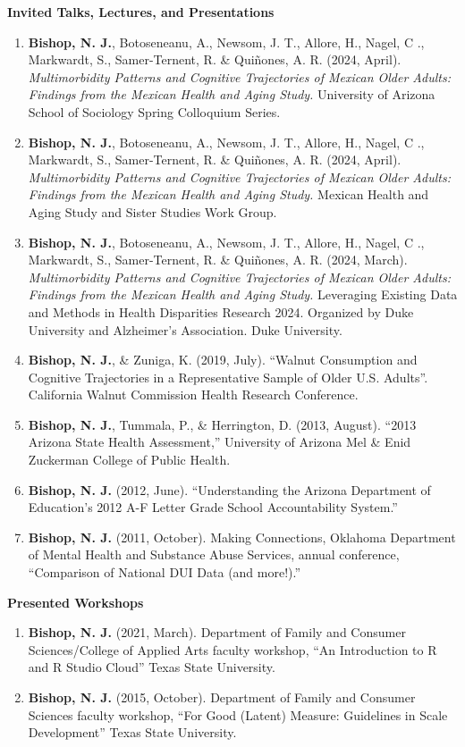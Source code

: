 \documentclass[
]{article}
\begin{document}
\textbf{Invited Talks, Lectures, and Presentations}

\begin{enumerate}
\def\labelenumi{\arabic{enumi}.}
\item
  \textbf{Bishop, N. J.}, Botoseneanu, A., Newsom, J. T., Allore, H.,
  Nagel, C ., Markwardt, S., Samer-Ternent, R. \& Quiñones, A. R. (2024,
  April). \emph{Multimorbidity Patterns and Cognitive Trajectories of
  Mexican Older Adults: Findings from the Mexican Health and Aging
  Study.} University of Arizona School of Sociology Spring Colloquium
  Series.
\item
  \textbf{Bishop, N. J.}, Botoseneanu, A., Newsom, J. T., Allore, H.,
  Nagel, C ., Markwardt, S., Samer-Ternent, R. \& Quiñones, A. R. (2024,
  April). \emph{Multimorbidity Patterns and Cognitive Trajectories of
  Mexican Older Adults: Findings from the Mexican Health and Aging
  Study.} Mexican Health and Aging Study and Sister Studies Work Group.
\item
  \textbf{Bishop, N. J.}, Botoseneanu, A., Newsom, J. T., Allore, H.,
  Nagel, C ., Markwardt, S., Samer-Ternent, R. \& Quiñones, A. R. (2024,
  March). \emph{Multimorbidity Patterns and Cognitive Trajectories of
  Mexican Older Adults: Findings from the Mexican Health and Aging
  Study.} Leveraging Existing Data and Methods in Health Disparities
  Research 2024. Organized by Duke University and Alzheimer's
  Association. Duke University.
\item
  \textbf{Bishop, N. J.}, \& Zuniga, K. (2019, July). ``Walnut
  Consumption and Cognitive Trajectories in a Representative Sample of
  Older U.S. Adults''. California Walnut Commission Health Research
  Conference.
\item
  \textbf{Bishop, N. J.}, Tummala, P., \& Herrington, D. (2013, August).
  ``2013 Arizona State Health Assessment,'' University of Arizona Mel \&
  Enid Zuckerman College of Public Health.
\item
  \textbf{Bishop, N. J.} (2012, June). ``Understanding the Arizona
  Department of Education's 2012 A-F Letter Grade School Accountability
  System.''
\item
  \textbf{Bishop, N. J.} (2011, October). Making Connections, Oklahoma
  Department of Mental Health and Substance Abuse Services, annual
  conference, ``Comparison of National DUI Data (and more!).''
\end{enumerate}

\textbf{Presented Workshops}

\begin{enumerate}
\def\labelenumi{\arabic{enumi}.}
\item
  \textbf{Bishop, N. J.} (2021, March). Department of Family and
  Consumer Sciences/College of Applied Arts faculty workshop, ``An
  Introduction to R and R Studio Cloud'' Texas State University.
\item
  \textbf{Bishop, N. J.} (2015, October). Department of Family and
  Consumer Sciences faculty workshop, ``For Good (Latent) Measure:
  Guidelines in Scale Development'' Texas State University.
\end{enumerate}
\end{document}
